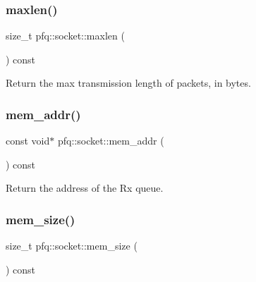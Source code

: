 \mbox{\label{classpfq_1_1socket_ad2dd981ceb46a6b38caab3cf821e6d46}} 
\subsubsection{\texorpdfstring{maxlen()}{maxlen()}}
{\footnotesize\ttfamily size\+\_\+t pfq\+::socket\+::maxlen (\begin{DoxyParamCaption}{ }\end{DoxyParamCaption}) const\hspace{0.3cm}{\ttfamily [inline]}}



Return the max transmission length of packets, in bytes. 

\mbox{\label{classpfq_1_1socket_aac25000416bf154eb0e3d632e051a202}} 
\subsubsection{\texorpdfstring{mem\+\_\+addr()}{mem\_addr()}}
{\footnotesize\ttfamily const void$\ast$ pfq\+::socket\+::mem\+\_\+addr (\begin{DoxyParamCaption}{ }\end{DoxyParamCaption}) const\hspace{0.3cm}{\ttfamily [inline]}}



Return the address of the Rx queue. 

\mbox{\label{classpfq_1_1socket_af4e748efa70a0b0c80eb5abf6a0d0277}} 
\subsubsection{\texorpdfstring{mem\+\_\+size()}{mem\_size()}}
{\footnotesize\ttfamily size\+\_\+t pfq\+::socket\+::mem\+\_\+size (\begin{DoxyParamCaption}{ }\end{DoxyParamCaption}) const\hspace{0.3cm}{\ttfamily [inline]}}



